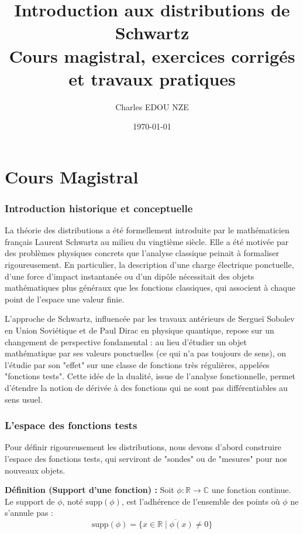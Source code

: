 \documentclass[11pt,a4paper]{article}
\title{\Huge Introduction aux distributions de Schwartz \\ \large Cours magistral, exercices corrigés et travaux pratiques}
\author{\Large Charles EDOU NZE}
\date{\today}
\begin{document}
\maketitle
\tableofcontents
\newpage

\part{Cours Magistral}


\section{Introduction historique et conceptuelle}

La théorie des distributions a été formellement introduite par le mathématicien français Laurent Schwartz au milieu du vingtième siècle. Elle a été motivée par des problèmes physiques concrets que l'analyse classique peinait à formaliser rigoureusement. En particulier, la description d'une charge électrique ponctuelle, d'une force d'impact instantanée ou d'un dipôle nécessitait des objets mathématiques plus généraux que les fonctions classiques, qui associent à chaque point de l'espace une valeur finie.

L'approche de Schwartz, influencée par les travaux antérieurs de Sergueï Sobolev en Union Soviétique et de Paul Dirac en physique quantique, repose sur un changement de perspective fondamental : au lieu d'étudier un objet mathématique par ses valeurs ponctuelles (ce qui n'a pas toujours de sens), on l'étudie par son "effet" sur une classe de fonctions très régulières, appelées "fonctions tests". Cette idée de la dualité, issue de l'analyse fonctionnelle, permet d'étendre la notion de dérivée à des fonctions qui ne sont pas différentiables au sens usuel.

\section{L'espace des fonctions tests}

Pour définir rigoureusement les distributions, nous devons d'abord construire l'espace des fonctions tests, qui serviront de "sondes" ou de "mesures" pour nos nouveaux objets.

\textbf{Définition (Support d'une fonction) :} Soit $\phi : \mathbb{R} \to \mathbb{C}$ une fonction continue. Le support de $\phi$, noté $\text{supp}(\phi)$, est l'adhérence de l'ensemble des points où $\phi$ ne s'annule pas :
$$\text{supp}(\phi) = \overline{\{ x \in \mathbb{R} \mid \phi(x) \neq 0 \}}$$
\end{document}

